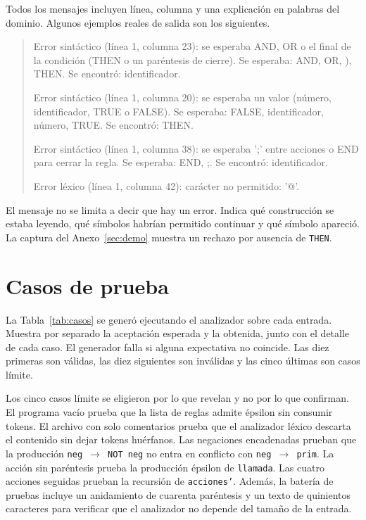\documentclass[11pt,letterpaper]{article}
\newcommand{\code}[1]{\texttt{#1}}
\begin{document}
Todos los mensajes incluyen línea, columna y una explicación en palabras del dominio. Algunos ejemplos reales de salida son los siguientes.

\begin{quote}
\small\ttfamily\raggedright
Error sintáctico (línea 1, columna 23): se esperaba AND, OR o el final de la condición (THEN o un paréntesis de cierre). Se esperaba: AND, OR, ), THEN. Se encontró: identificador.

Error sintáctico (línea 1, columna 20): se esperaba un valor (número, identificador, TRUE o FALSE). Se esperaba: FALSE, identificador, número, TRUE. Se encontró: THEN.

Error sintáctico (línea 1, columna 38): se esperaba ';' entre acciones o END para cerrar la regla. Se esperaba: END, ;. Se encontró: identificador.

Error léxico (línea 1, columna 42): carácter no permitido: '@'.
\end{quote}

El mensaje no se limita a decir que hay un error. Indica qué construcción se estaba leyendo, qué símbolos habrían permitido continuar y qué símbolo apareció. La captura del Anexo~\ref{sec:demo} muestra un rechazo por ausencia de \code{THEN}.

\section{Casos de prueba}

La Tabla~\ref{tab:casos} se generó ejecutando el analizador sobre cada entrada. Muestra por separado la aceptación esperada y la obtenida, junto con el detalle de cada caso. El generador falla si alguna expectativa no coincide. Las diez primeras son válidas, las diez siguientes son inválidas y las cinco últimas son casos límite.



Los cinco casos límite se eligieron por lo que revelan y no por lo que confirman. El programa vacío prueba que la lista de reglas admite épsilon sin consumir tokens. El archivo con solo comentarios prueba que el analizador léxico descarta el contenido sin dejar tokens huérfanos. Las negaciones encadenadas prueban que la producción \code{neg $\rightarrow$ NOT neg} no entra en conflicto con \code{neg $\rightarrow$ prim}. La acción sin paréntesis prueba la producción épsilon de \code{llamada}. Las cuatro acciones seguidas prueban la recursión de \code{acciones'}. Además, la batería de pruebas incluye un anidamiento de cuarenta paréntesis y un texto de quinientos caracteres para verificar que el analizador no depende del tamaño de la entrada.
\end{document}
